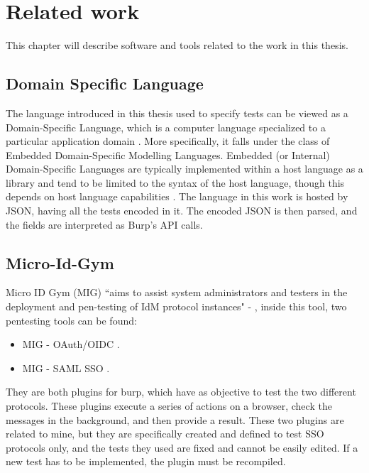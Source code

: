 \chapter{Related work}
\label{chap:Related_work}
This chapter will describe software and tools related to the work in this thesis.

\section{Domain Specific Language}
The language introduced in this thesis used to specify tests can be viewed as a Domain-Specific Language, which is a computer language specialized to a particular application domain \cite{wikipedia_dsl}. More specifically, it falls under the class of Embedded Domain-Specific Modelling Languages. Embedded (or Internal) Domain-Specific Languages are typically implemented within a host language as a library and tend to be limited to the syntax of the host language, though this depends on host language capabilities \cite{wikipedia_dsl}. The language in this work is hosted by JSON, having all the tests encoded in it. The encoded JSON is then parsed, and the fields are interpreted as Burp's API calls.

\section{Micro-Id-Gym}
\label{sec:micro-id-gym}
Micro ID Gym (MIG) ``aims to assist system administrators and testers in the deployment and pen-testing of IdM protocol instances" - \cite{micro_id_gym}, inside this tool, two pentesting tools can be found:
\begin{itemize}
    \item MIG - OAuth/OIDC \cite{claudio_grisenti}.
    \item MIG - SAML SSO \cite{stefano_facchini}.
\end{itemize}
They are both plugins for \Gls{burp}, which have as objective to test the two different protocols. These plugins execute a series of actions on a browser, check the messages in the background, and then provide a result.
These two plugins are related to mine, but they are specifically created and defined to test SSO protocols only, and the tests they used are fixed and cannot be easily edited. If a new test has to be implemented, the plugin must be recompiled.


